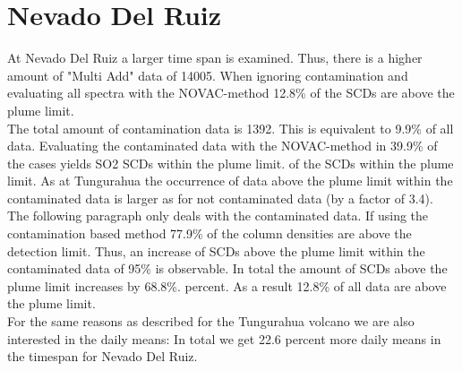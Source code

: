 \documentclass  [
  paper    = a4,
  BCOR     = 10mm,
  twoside,
  fontsize = 12pt,
  fleqn,
  toc      = bibnumbered,
  toc      = listofnumbered,
  numbers  = noendperiod,
  headings = normal,
  listof   = leveldown,
  version  = 3.03
]                                       {scrreprt}
\begin{document}
	


\section{Nevado Del Ruiz}
At Nevado Del Ruiz a larger time span is examined. Thus, there is a higher amount of "Multi Add" data of 14005.
When ignoring contamination and evaluating all spectra with the NOVAC-method 12.8\% of the  SCDs are above the plume limit.\\
The total amount of contamination data is 1392. This is equivalent to 9.9\% of all data. Evaluating the contaminated data with the NOVAC-method in 39.9\% of the cases yields SO2 SCDs within the plume limit. of the  SCDs within the plume limit. As at Tungurahua the occurrence of data above the plume limit within the contaminated data is larger as for not contaminated data (by a factor of 3.4).\\
The following paragraph only deals with the contaminated data.
If using the contamination based method 77.9\% of the  column densities are above the detection limit. Thus, an increase of  SCDs above the plume limit within the contaminated data of 95\% is observable. In total the amount of  SCDs above the plume limit increases by  68.8\%. percent. As a result 12.8\% of all data are above the plume limit.\\
For the same reasons as described for the Tungurahua volcano we are also interested in the daily means: In total we get 22.6 percent more daily means in the timespan for Nevado Del Ruiz.\\
\\
\FloatBarrier

%
%
%
\end{document}
